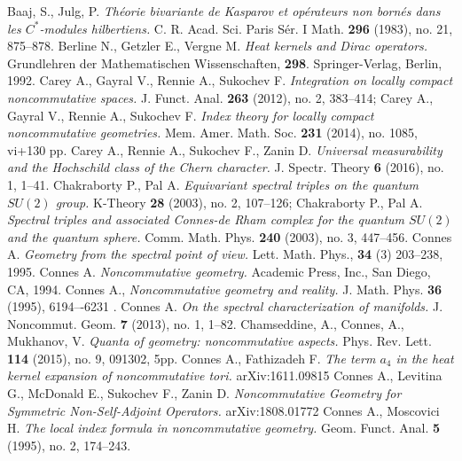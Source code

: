 \documentclass{article}
\begin{document}
\begin{thebibliography}{99}
\setlength{\itemsep}{0 pt}
\setlength{\parskip}{0pt}
\setlength{\parsep}{0pt}
 Baaj, S., Julg, P. {\it Th\'eorie bivariante de Kasparov et op\'erateurs non born\'es dans les $C^*$-modules hilbertiens.} C. R. Acad. Sci. Paris S\'er. I Math. {\bf 296} (1983), no. 21, 875--878.
 Berline N., Getzler E., Vergne M. {\it Heat kernels and Dirac operators.} Grundlehren der Mathematischen Wissenschaften, {\bf 298}. Springer-Verlag, Berlin, 1992.
 Carey A., Gayral V., Rennie A., Sukochev F. {\it Integration on locally compact noncommutative spaces.} J. Funct. Anal. {\bf 263} (2012), no. 2, 383--414; Carey A., Gayral V., Rennie A., Sukochev F. {\it Index theory for locally compact noncommutative geometries.} Mem. Amer. Math. Soc. {\bf 231} (2014), no. 1085, vi+130 pp.
 Carey A., Rennie A., Sukochev F., Zanin D. {\it Universal measurability and the Hochschild class of the Chern character.} J. Spectr. Theory {\bf 6} (2016), no. 1, 1--41.
 Chakraborty P., Pal A. {\it Equivariant spectral triples on the quantum $SU(2)$ group.} K-Theory {\bf 28} (2003), no. 2, 107--126;  Chakraborty P., Pal A. {\it Spectral triples and associated Connes-de Rham complex for the quantum $SU(2)$ and the quantum sphere.} Comm. Math. Phys. {\bf 240} (2003), no. 3, 447--456.
 Connes A. {\it Geometry from the spectral point of view.} Lett. Math. Phys., {\bf 34} (3) 203--238, 1995.
  Connes A. {\it Noncommutative geometry.} Academic Press, Inc., San Diego, CA, 1994.
 Connes A., {\it Noncommutative geometry and reality.} J. Math. Phys. {\bf 36} (1995), 6194–-6231 .
 Connes A. {\it On the spectral characterization of manifolds.} J. Noncommut. Geom. {\bf 7} (2013), no. 1, 1--82.
 Chamseddine, A., Connes, A., Mukhanov, V. {\it Quanta of geometry: noncommutative aspects.} Phys. Rev. Lett. {\bf 114} (2015), no. 9, 091302, 5pp.
 Connes A., Fathizadeh F. {\it The term $a_4$ in the heat kernel expansion of noncommutative tori.} arXiv:1611.09815
 Connes A., Levitina G., McDonald E., Sukochev F., Zanin D. {\it Noncommutative Geometry for Symmetric Non-Self-Adjoint Operators.} arXiv:1808.01772 
 Connes A., Moscovici H. {\it The local index formula in noncommutative geometry.} Geom. Funct. Anal. {\bf 5} (1995), no. 2, 174--243.

\end{thebibliography}
\end{document}
